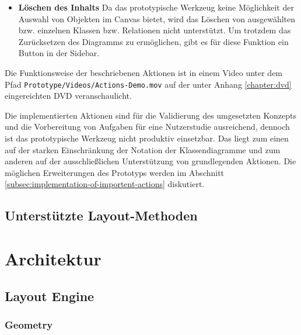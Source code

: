 \begin{itemize}
    \item \textbf{Löschen des Inhalts} Da das prototypische Werkzeug keine Möglichkeit der Auswahl von Objekten im Canvas bietet, wird das Löschen von ausgewählten bzw. einzelnen Klassen bzw. Relationen nicht unterstützt. Um trotzdem das Zurücksetzen des Diagramms zu ermöglichen, gibt es für diese Funktion ein Button in der Sidebar.
\end{itemize}

Die Funktionsweise der beschriebenen Aktionen ist in einem Video unter dem Pfad \texttt{Prototype/\-Videos\-/Actions-De\-mo.mov} auf der unter Anhang \ref{chapter:dvd} eingereichten DVD veranschaulicht.

Die implementierten Aktionen sind für die Validierung des umgesetzten Konzepts und die Vorbereitung von Aufgaben für eine Nutzerstudie ausreichend, dennoch ist das prototypische Werkzeug nicht produktiv einsetzbar. Das liegt zum einen auf der starken Einschränkung der Notation der Klassendiagramme und zum anderen auf der ausschließlichen Unterstützung von grundlegenden Aktionen. Die möglichen Erweiterungen des Prototyps werden im Abschnitt \ref{subsec:implementation-of-importent-actions} diskutiert.

\subsection{Unterstützte Layout-Methoden}
\label{subsec:supported-layout-methods}



\section{Architektur}
\label{sec:architecture}


\subsection{Layout Engine}


\subsubsection{Geometry}

